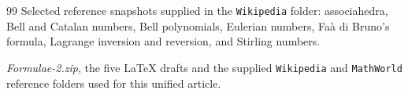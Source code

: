 \documentclass[11pt,a4paper,oneside,openany]{book}
\theoremstyle{definition}
\theoremstyle{remark}
\begin{document}
\begin{thebibliography}{99}
Selected reference snapshots supplied in the \nolinkurl{Wikipedia} folder:
associahedra, Bell and Catalan numbers, Bell polynomials, Eulerian numbers,
Fa\`a di Bruno's formula, Lagrange inversion and reversion, and Stirling
numbers.

\emph{Formulae-2.zip}, the five LaTeX drafts and the supplied
\nolinkurl{Wikipedia} and \nolinkurl{MathWorld} reference folders used for this
unified article.

\end{thebibliography}

\printindex
\end{document}
